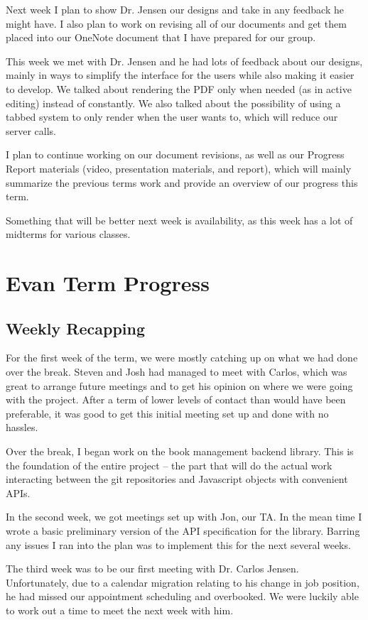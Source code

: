 \documentclass[onecolumn, draftclsnofoot,10pt, compsoc]{IEEEtran}
\begin{document}
Next week I plan to show Dr. Jensen our designs and take in any feedback he
might have. I also plan to work on revising all of our documents and get them
placed into our OneNote document that I have prepared for our group.


This week we met with Dr. Jensen and he had lots of feedback about our designs,
mainly in ways to simplify the interface for the users while also making it
easier to develop. We talked about rendering the PDF only when needed
(as in active editing) instead of constantly. We also talked about the
possibility of using a tabbed system to only render when the user wants to,
which will reduce our server calls.

I plan to continue working on our document revisions, as well as our Progress
Report materials (video, presentation materials, and report), which will mainly
summarize the previous terms work and provide an overview of our progress
this term.

Something that will be better next week is availability, as this week has a
lot of midterms for various classes.


\section{Evan Term Progress}

\subsection{Weekly Recapping}
For the first week of the term, we were mostly catching up on what we had done
over the break. Steven and Josh had managed to meet with Carlos, which was great
to arrange future meetings and to get his opinion on where we were going with
the project. After a term of lower levels of contact than would have been
preferable, it was good to get this initial meeting set up and done with no
hassles.

Over the break, I began work on the book management backend library. This is the
foundation of the entire project -- the part that will do the actual work
interacting between the git repositories and Javascript objects with convenient
APIs.

In the second week, we got meetings set up with Jon, our TA. In the mean time I
wrote a basic preliminary version of the API specification for the library.
Barring any issues I ran into the plan was to implement this for the next
several weeks.

The third week was to be our first meeting with Dr. Carlos Jensen.
Unfortunately, due to a calendar migration relating to his change in job
position, he had missed our appointment scheduling and overbooked. We were
luckily able to work out a time to meet the next week with him.
\end{document}
